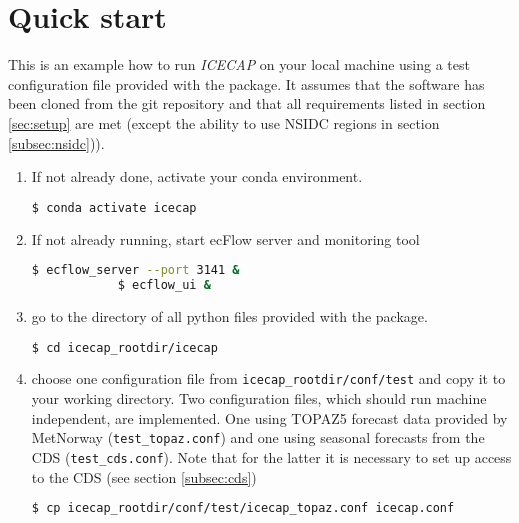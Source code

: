 \documentclass[DIV=10, parskip=full]{scrreprt}
\newcommand{\ice}{\textit{ICECAP}\xspace}
\begin{document}
\section{Quick start} \label{sec:quick_start}
This is an example how to run \ice on your local machine using a test configuration file provided with the package. It assumes that the software has been cloned from the git repository and that all requirements listed in section \ref{sec:setup} are met (except the ability to use NSIDC regions in section \ref{subsec:nsidc})).

\begin{enumerate}
	\item If not already done, activate your conda environment.
	\begin{lstlisting}[language=bash]
		$ conda activate icecap 
	\end{lstlisting}
	
	\item If not already running, start ecFlow server and monitoring tool 
		\begin{lstlisting}[language=bash]
			$ ecflow_server --port 3141 &
			$ ecflow_ui & 
		\end{lstlisting}

		
	\item go to the directory of all python files provided with the package.
	\begin{lstlisting}[language=bash]
		$ cd icecap_rootdir/icecap
	\end{lstlisting}
	
	\item choose one configuration file from \texttt{icecap\_rootdir/conf/test} and copy it to your working directory. Two configuration files, which should run machine independent, are implemented. One using TOPAZ5 forecast data provided by MetNorway (\texttt{test\_topaz.conf}) and one using seasonal forecasts from the CDS (\texttt{test\_cds.conf}). Note that for the latter it is necessary to set up access to the CDS (see section \ref{subsec:cds})\\
	\begin{lstlisting}[language=bash]
		$ cp icecap_rootdir/conf/test/icecap_topaz.conf icecap.conf
	\end{lstlisting}
	

\end{enumerate}
\end{document}

